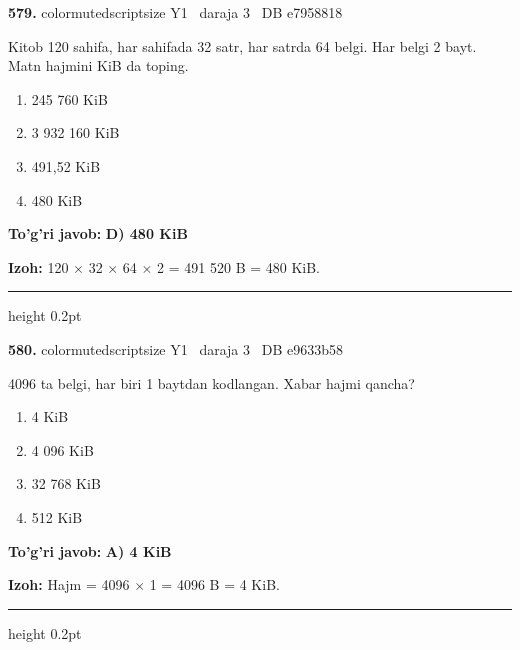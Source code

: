 \documentclass[10pt,a4paper,oneside]{article}
\begin{document}
\noindent\textbf{\color{ink}579.}  {color{muted}scriptsize Y1 \textbullet\ daraja 3 \textbullet\ DB e7958818}
\par
Kitob 120 sahifa, har sahifada 32 satr, har satrda 64 belgi. Har belgi 2 bayt. Matn hajmini KiB da toping.
\begin{enumerate}[label=\Alph*),leftmargin=9mm]
\item 245 760 KiB
\item 3 932 160 KiB
\item 491,52 KiB
\item 480 KiB
\end{enumerate}
\begin{tcolorbox}[enhanced,breakable,colback=teal!4,colframe=teal!50!black,boxrule=0.5pt,arc=1.1mm,left=3mm,right=3mm,top=1.7mm,bottom=1.7mm,before skip=2mm,after skip=2mm]
\textbf{\color{teal}To'g'ri javob:} \textbf{D) 480 KiB}
\par\smallskip
\textbf{Izoh:} 120 \ensuremath{\times} 32 \ensuremath{\times} 64 \ensuremath{\times} 2 = 491 520 B = 480 KiB.
\end{tcolorbox}
\vspace{2mm}\hrule height 0.2pt \vspace{3mm}

\noindent\textbf{\color{ink}580.}  {color{muted}scriptsize Y1 \textbullet\ daraja 3 \textbullet\ DB e9633b58}
\par
4096 ta belgi, har biri 1 baytdan kodlangan. Xabar hajmi qancha?
\begin{enumerate}[label=\Alph*),leftmargin=9mm]
\item 4 KiB
\item 4 096 KiB
\item 32 768 KiB
\item 512 KiB
\end{enumerate}
\begin{tcolorbox}[enhanced,breakable,colback=teal!4,colframe=teal!50!black,boxrule=0.5pt,arc=1.1mm,left=3mm,right=3mm,top=1.7mm,bottom=1.7mm,before skip=2mm,after skip=2mm]
\textbf{\color{teal}To'g'ri javob:} \textbf{A) 4 KiB}
\par\smallskip
\textbf{Izoh:} Hajm = 4096 \ensuremath{\times} 1 = 4096 B = 4 KiB.
\end{tcolorbox}
\vspace{2mm}\hrule height 0.2pt \vspace{3mm}
\end{document}
